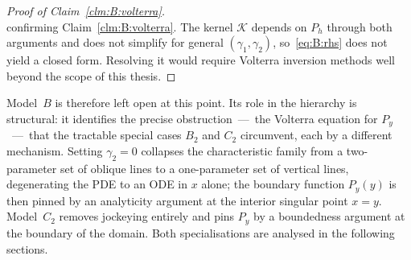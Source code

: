 \begin{proof}[Proof of Claim~\ref{clm:B:volterra}]
\begin{equation}
    \label{eq:B:rhs}
\end{equation}
confirming Claim~\ref{clm:B:volterra}.
The kernel $\mathcal{K}$ depends on $P_h$ through both arguments and does not simplify for
general $(\gamma_1,\gamma_2)$, so~\eqref{eq:B:rhs} does not yield a closed form.  Resolving
it would require Volterra inversion methods well beyond the scope of this thesis.
\end{proof}

Model~$B$ is therefore left open at this point.  Its role in the hierarchy is
structural: it identifies the precise obstruction~---~the Volterra equation
for $P_y$~---~that the tractable special cases $B_2$ and $C_2$ circumvent, each
by a different mechanism.  Setting $\gamma_2=0$ collapses the characteristic
family from a two-parameter set of oblique lines to a one-parameter set of
vertical lines, degenerating the PDE to an ODE in $x$ alone; the boundary
function $P_y(y)$ is then pinned by an analyticity argument at the interior
singular point $x=y$.  Model~$C_2$ removes jockeying entirely and pins $P_y$ by
a boundedness argument at the boundary of the domain.  Both specialisations are
analysed in the following sections.
